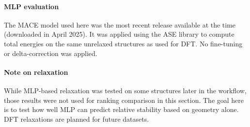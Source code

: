 \paragraph{MLP evaluation}

The MACE model used here was the most recent release available at the time (downloaded in April 2025). It was applied using the ASE library to compute total energies on the same unrelaxed structures as used for DFT. No fine-tuning or delta-correction was applied.

\paragraph{Note on relaxation}

While MLP-based relaxation was tested on some structures later in the workflow, those results were not used for ranking comparison in this section. The goal here is to test how well MLP can predict relative stability based on geometry alone. DFT relaxations are planned for future datasets.